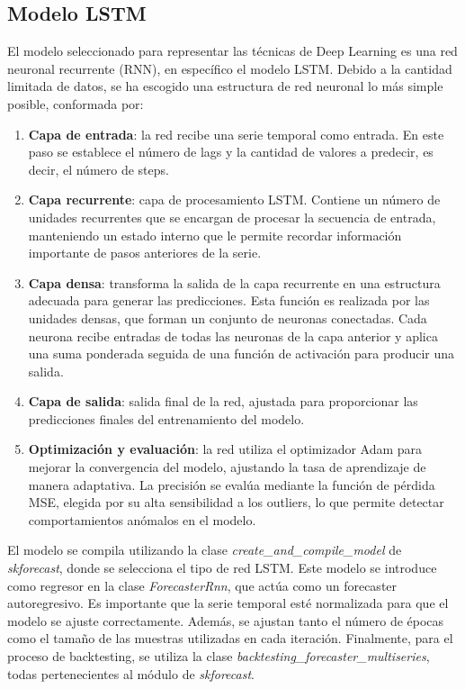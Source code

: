 \documentclass[12pt,a4paper]{report}
\begin{document}
\subsection{Modelo LSTM}

El modelo seleccionado para representar las técnicas de Deep Learning es una red neuronal recurrente (RNN), en específico el modelo LSTM. Debido a la cantidad limitada de datos, se ha escogido una estructura de red neuronal lo más simple posible, conformada por:

\begin{enumerate}
    \item \textbf{Capa de entrada}: la red recibe una serie temporal como entrada. En este paso se establece el número de lags y la cantidad de valores a predecir, es decir, el número de steps.

    \item \textbf{Capa recurrente}: capa de procesamiento LSTM. Contiene un número de unidades recurrentes que se encargan de procesar la secuencia de entrada, manteniendo un estado interno que le permite recordar información importante de pasos anteriores de la serie.

    \item \textbf{Capa densa}: transforma la salida de la capa recurrente en una estructura adecuada para generar las predicciones. Esta función es realizada por las unidades densas, que forman un conjunto de neuronas conectadas. Cada neurona recibe entradas de todas las neuronas de la capa anterior y aplica una suma ponderada seguida de una función de activación para producir una salida.
    
    \item \textbf{Capa de salida}: salida final de la red, ajustada para proporcionar las predicciones finales del entrenamiento del modelo.

    \item \textbf{Optimización y evaluación}: la red utiliza el optimizador Adam para mejorar la convergencia del modelo, ajustando la tasa de aprendizaje de manera adaptativa. La precisión se evalúa mediante la función de pérdida MSE, elegida por su alta sensibilidad a los outliers, lo que permite detectar comportamientos anómalos en el modelo.
\end{enumerate}



El modelo se compila utilizando la clase \textit{create\_and\_compile\_model} de \textit{skforecast}, donde se selecciona el tipo de red LSTM. Este modelo se introduce como regresor en la clase \textit{ForecasterRnn}, que actúa como un forecaster autoregresivo. Es importante que la serie temporal esté normalizada para que el modelo se ajuste correctamente. Además, se ajustan tanto el número de épocas como el tamaño de las muestras utilizadas en cada iteración. Finalmente, para el proceso de backtesting, se utiliza la clase \textit{backtesting\_forecaster\_multiseries}, todas pertenecientes al módulo de \textit{skforecast}.
\end{document}
